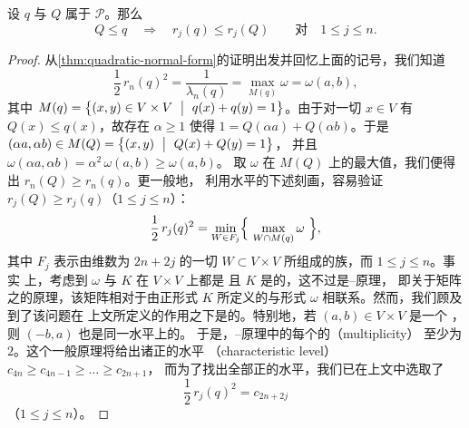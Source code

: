 \begin{proposition}\label{prop:quadratic-monotonicity}
设 $q$ 与 $Q$ 属于 $\mathcal{P}$。那么
\[
Q\leq q\quad\Longrightarrow\quad r_j(q)\leq r_j(Q)
\qquad\text{对}\quad 1\leq j\leq n.
\]
\end{proposition}
\begin{proof}
从\cref{thm:quadratic-normal-form}的证明出发并回忆上面的记号，我们知道
\[
\frac{1}{2}\,r_n(q)^{2}=\frac{1}{\lambda_n(q)}=\max_{M(q)}\omega=\omega(a,b),
\]
其中 $M(q)=\bigl\{(x,y)\in V\times V\ \bigm|\ q(x)+q(y)=1\bigr\}$。由于对一切%
$x\in V$ 有 $Q(x)\leq q(x)$，故存在 $\alpha\geq1$ 使得%
$1=Q(\alpha a)+Q(\alpha b)$。于是%
$(\alpha a,\alpha b)\in M(Q)=\bigl\{(x,y)\ \bigm|\ Q(x)+Q(y)=1\bigr\}$，%
并且 $\omega(\alpha a,\alpha b)=\alpha^{2}\,\omega(a,b)\geq\omega(a,b)$。%
取 $\omega$ 在 $M(Q)$ 上的最大值，我们便得出 $r_n(Q)\geq r_n(q)$。更一般地，%
利用\trCritical{}水平的下述\trMinimax{}刻画，容易验证\trEstimate{}%
$r_j(Q)\geq r_j(q)$（$1\leq j\leq n$）：
\[
\frac{1}{2}\,r_j(q)^{2}=\min_{W\in F_j}\Bigl\{\ \max_{W\cap M(q)}\omega\ \Bigr\},
\]
其中 $F_j$ 表示由维数为 $2n+2j$ 的一切\trLinear\trSubspace{}%
$W\subset V\times V$ 所组成的族，而 $1\leq j\leq n$。事实%
上，考虑到 $\omega$ 与 $K$ 在\trProductSpace{} $V\times V$ 上都是\trQuadraticForm{}%
且 $K$ 是\trPositiveDefinite{}的，这不过是\trCourant--\trHilbert{}\trMinimax{}原理，%
即关于\trSymmetric{}矩阵之\trEigenvalue{}的原理，该矩阵相对于由正形式 $K$%
所定义的\trInnerProduct{}与形式 $\omega$ 相联系。然而，我们顾及到了该问题在%
上文所定义的\trCircle{}作用之下是\trInvariant{}的。特别地，若 $(a,b)\in V\times V$ 是一个%
\trCriticalPoint，则 $(-b,a)$ 也是同一\trCritical{}水平上的\trCriticalPoint。%
于是，\trCourant--\trHilbert{}原理中的每个\trEigenvalue{}的\textbf{\trMultiplicity}（multiplicity）%
至少为 $2$。这个一般原理将给出诸正的\trCharacteristic{}水平%
（characteristic level）$c_{4n}\geq c_{4n-1}\geq\dots\geq c_{2n+1}$，%
而为了找出全部正的\trCritical{}水平，我们已在上文中选取了
\[
\frac{1}{2}\,r_j(q)^{2}=c_{2n+2j}
\]
（$1\leq j\leq n$）。
\end{proof}

